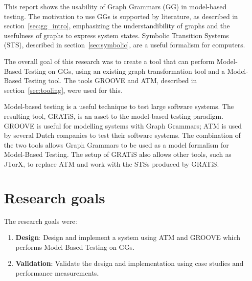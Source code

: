 This report shows the usability of Graph Grammars (GG) in model-based testing. The motivation to use GGs is supported by literature, as described in section~\ref{sec:gg_intro}, emphasizing the understandibility of graphs and the usefulness of graphs to express system states. Symbolic Transition Systems (STS), described in section~\ref{sec:symbolic}, are a useful formalism for computers. 

The overall goal of this research was to create a tool that can perform Model-Based Testing on GGs, using an existing graph transformation tool and a Model-Based Testing tool. The tools GROOVE and ATM, described in section~\ref{sec:tooling}, were used for this.

Model-based testing is a useful technique to test large software systems. The resulting tool, GRATiS, is an asset to the model-based testing paradigm. GROOVE is useful for modelling systems with Graph Grammars; ATM is used by several Dutch companies to test their software systems. The combination of the two tools allows Graph Grammars to be used as a model formalism for Model-Based Testing. The setup of GRATiS also allows other tools, such as JTorX, to replace ATM and work with the STSs produced by GRATiS.

\section{Research goals}
The research goals were:
\begin{enumerate}
  \item \textbf{Design}: Design and implement a system using ATM and GROOVE which performs Model-Based Testing on GGs.
  \item \textbf{Validation}: Validate the design and implementation using case studies and performance measurements.
\end{enumerate}

